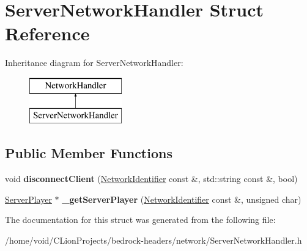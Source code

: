 \hypertarget{struct_server_network_handler}{}\section{Server\+Network\+Handler Struct Reference}
\label{struct_server_network_handler}
Inheritance diagram for Server\+Network\+Handler\+:\begin{figure}[H]
\begin{center}
\leavevmode
\includegraphics[height=2.000000cm]{struct_server_network_handler}
\end{center}
\end{figure}
\subsection*{Public Member Functions}
\begin{DoxyCompactItemize}
\item 
\mbox{\label{struct_server_network_handler_a3f2ad30dcd4b71174e83a7a9d90aa8a7}} 
void {\bfseries disconnect\+Client} (\mbox{\hyperlink{struct_network_identifier}{Network\+Identifier}} const \&, std\+::string const \&, bool)
\item 
\mbox{\label{struct_server_network_handler_ad6544ef19dcbbdc618017aa168b0dece}} 
\mbox{\hyperlink{struct_server_player}{Server\+Player}} $\ast$ {\bfseries \+\_\+get\+Server\+Player} (\mbox{\hyperlink{struct_network_identifier}{Network\+Identifier}} const \&, unsigned char)
\end{DoxyCompactItemize}


The documentation for this struct was generated from the following file\+:\begin{DoxyCompactItemize}
\item 
/home/void/\+C\+Lion\+Projects/bedrock-\/headers/network/Server\+Network\+Handler.\+h\end{DoxyCompactItemize}
